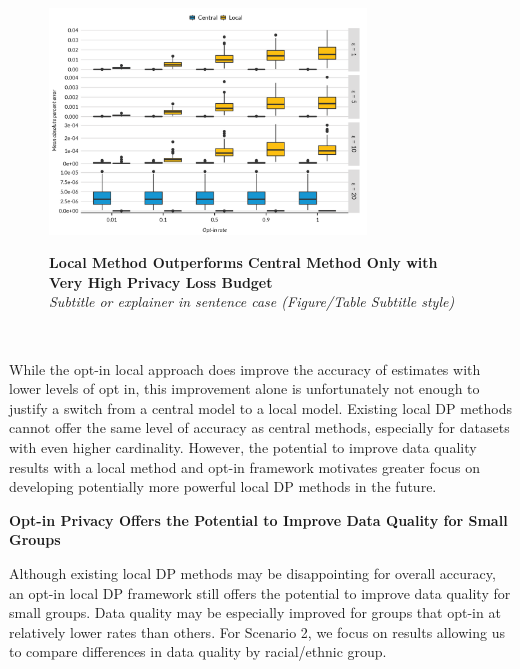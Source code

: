 \documentclass[
]{urban-formatting}
\begin{document}
\begin{figure}[htbp]
    \caption{
    \textbf{Local Method Outperforms Central Method Only with Very High Privacy Loss Budget}\\
    \textit{Subtitle or explainer in sentence case (Figure/Table Subtitle style)}
    }
    \centering
    \includegraphics[width=0.75\textwidth]{../analysis/figures/dec-methods-accuracy.png}
    \label{fig:dec-methods-accuracy}
\end{figure}
\begin{singlespace}
    \\
\end{singlespace}

While the opt-in local approach does improve the accuracy of estimates
with lower levels of opt in, this improvement alone is unfortunately not
enough to justify a switch from a central model to a local model.
Existing local DP methods cannot offer the same level of accuracy as
central methods, especially for datasets with even higher cardinality.
However, the potential to improve data quality results with a local
method and opt-in framework motivates greater focus on developing
potentially more powerful local DP methods in the future.

\textbf{Opt-in Privacy Offers the Potential to Improve Data Quality for
Small Groups}

Although existing local DP methods may be disappointing for overall
accuracy, an opt-in local DP framework still offers the potential to
improve data quality for small groups. Data quality may be especially
improved for groups that opt-in at relatively lower rates than others.
For Scenario 2, we focus on results allowing us to compare differences
in data quality by racial/ethnic group.
\end{document}
